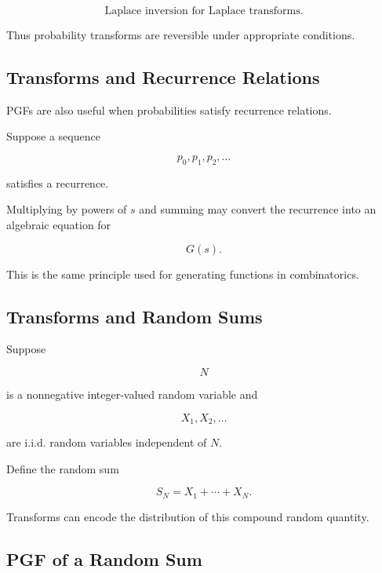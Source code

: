 \[
\boxed{
\text{Laplace inversion for Laplace transforms}.
}
\]

Thus probability transforms are reversible under appropriate
conditions.

\subsection{Transforms and Recurrence Relations}
\label{subsec:transforms-recurrence-relations}

PGFs are also useful when probabilities satisfy recurrence relations.

Suppose a sequence

\[
p_0,p_1,p_2,\ldots
\]

satisfies a recurrence.

Multiplying by powers of \(s\) and summing may convert the recurrence
into an algebraic equation for

\[
G(s).
\]

This is the same principle used for generating functions in
combinatorics.

\subsection{Transforms and Random Sums}
\label{subsec:transforms-random-sums}

Suppose

\[
N
\]

is a nonnegative integer-valued random variable and

\[
X_1,X_2,\ldots
\]

are i.i.d. random variables independent of \(N\).

Define the random sum

\[
S_N
=
X_1+\cdots+X_N.
\]

Transforms can encode the distribution of this compound random quantity.

\subsection{PGF of a Random Sum}
\label{subsec:pgf-random-sum}

